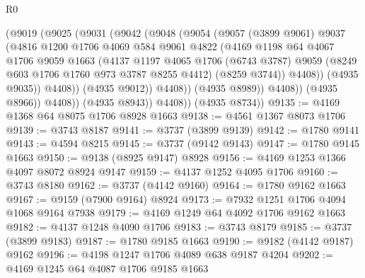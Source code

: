 \begin{lexlean}{R0}
\begin{coremodule}
                      (@9019
                        (@9025
                          (@9031
                            (@9042
                              (@9048
                                (@9054
                                  (@9057
                                    (@3899 @9061)
                                    @9037
                                    (@4816
                                      @1200
                                      @1706
                                      @4069
                                      @584
                                      @9061
                                      @4822
                                      (@4169
                                        @1198
                                        @64
                                        @4067
                                        @1706
                                        @9059
                                        @1663
                                        (@4137
                                          @1197
                                          @4065
                                          @1706
                                          (@6743 @3787)
                                          @9059
                                          (@8249 @603 @1706 @1760 @973 @3787 @8255 @4412)
                                          (@8259 @3744))
                                        @4408))
                                    (@4935 @9035))
                                  @4408))
                              (@4935 @9012))
                            @4408))
                        (@4935 @8989))
                      @4408))
                  (@4935 @8966))
                @4408))
            (@4935 @8943))
          @4408))
      (@4935 @8734))
@9135 := @4169 @1368 @64 @8075 @1706 @8928 @1663
@9138 := @4561 @1367 @8073 @1706
@9139 := @3743 @8187
@9141 := @3737 (@3899 @9139)
@9142 := @1780 @9141
@9143 := @4594 @8215
@9145 := @3737 (@9142 @9143)
@9147 := @1780 @9145 @1663
@9150 := @9138 (@8925 @9147) @8928
@9156 := @4169 @1253 @1366 @4097 @8072 @8924 @9147
@9159 := @4137 @1252 @4095 @1706
@9160 := @3743 @8180
@9162 := @3737 (@4142 @9160)
@9164 := @1780 @9162 @1663
@9167 := @9159 (@7900 @9164) @8924
@9173 := @7932 @1251 @1706 @4094 @1068 @9164 @7938
@9179 := @4169 @1249 @64 @4092 @1706 @9162 @1663
@9182 := @4137 @1248 @4090 @1706
@9183 := @3743 @8179
@9185 := @3737 (@3899 @9183)
@9187 := @1780 @9185 @1663
@9190 := @9182 (@4142 @9187) @9162
@9196 := @4198 @1247 @1706 @4089 @638 @9187 @4204
@9202 := @4169 @1245 @64 @4087 @1706 @9185 @1663

\end{coremodule}
\end{lexlean}

